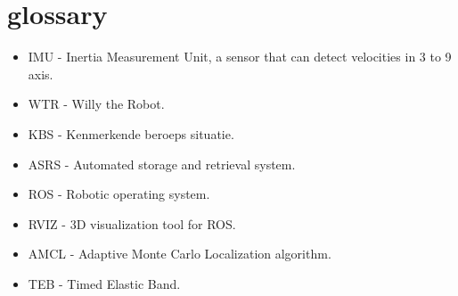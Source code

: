 \section{glossary}
\begin{itemize}
\item \label{trm::imu} IMU - Inertia Measurement Unit, a sensor that can detect velocities in 3 to 9 axis.
\item \label{trm::wtr} WTR - Willy the Robot.
\item \label{trm::kbs} KBS - Kenmerkende beroeps situatie.
\item \label{trm::asrs} ASRS - Automated storage and retrieval system.
\item \label{trm::ros} ROS - Robotic operating system.
\item \label{trm::rviz} RVIZ - 3D visualization tool for ROS.
\item \label{trm::amcl} AMCL - Adaptive Monte Carlo Localization algorithm.
\item \label{trm::teb} TEB - Timed Elastic Band.
\end{itemize}